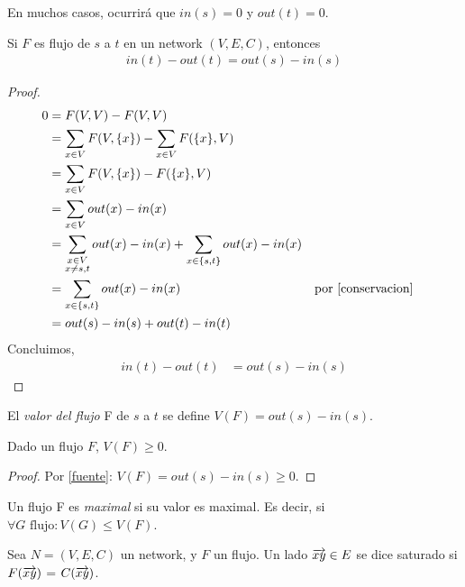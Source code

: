 En muchos casos, ocurrirá que $in(s) = 0$ y $out(t) = 0$.

\begin{proposition}
Si $F$ es flujo de $s$ a $t$ en un network $(V, E, C)$, entonces
\begin{align}
    in(t) - out(t) = out(s) - in(s)
\end{align}
\end{proposition}

\begin{proof}
\begin{align}
  0
  &= F(V,V) - F(V,V)\\
  &= \sum_{x \in V} F(V, \{x\}) - \sum_{x\in V} F(\{x\}, V)\\
  &= \sum_{x \in V} F(V, \{x\}) - F(\{x\}, V)\\
  &= \sum_{x \in V} out(x) - in(x)\\
  &= \sum_{\substack{x \in V \\ x \neq s,t}} out(x) - in(x) + \sum_{\substack{x \in \{s,t\}}} out(x) - in(x)\\
  &= \sum_{\substack{x \in \{s,t\}}} out(x) - in(x) &&\text{por \ref{conservacion}}\\
  &= out(s) - in(s) + out(t) - in(t)
\end{align}
Concluimos,
\begin{align}
  in(t) - out(t) &= out(s) - in(s)
\end{align}
\end{proof}

\begin{definition}
  El \emph{valor del flujo} F de $s$ a $t$ se define $V(F) = out(s) - in(s)$.
\end{definition}

\begin{proposition}
  Dado un flujo $F$, $V(F) \ge 0$.
\end{proposition}
\begin{proof}
  Por \ref{fuente}: $V(F) = out(s) - in(s) \ge 0$.
\end{proof}

\begin{definition}
  Un flujo F es \emph{maximal} si su valor es maximal. Es decir, si
  $\forall G \text{ flujo} \colon V(G) \le V(F)$.
\end{definition}

\begin{definition}
  Sea $N = (V,E,C)$ un network, y $F$ un flujo. Un lado $\overrightarrow{xy} \in E$ se dice
  saturado si $F(\overrightarrow{xy})$ = $C(\overrightarrow{xy})$.
\end{definition}

